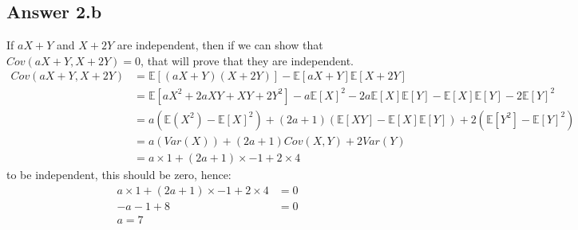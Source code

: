 \documentclass[a4paper]{article}
\begin{document}
\subsection{Answer 2.b}
If $aX+ Y $ and $X+2 Y$ are independent, then if we can show that $Cov\left( aX+Y, X+2Y \right) = 0$, that will prove that they are independent.
\begin{equation*}
	\begin{split}
		Cov\left( aX+Y, X+2Y \right) &= \mathbb{E}\left[ \left( aX+Y \right) \left( X+2Y \right)  \right] - \mathbb{E}\left[ aX+Y \right] \mathbb{E}\left[ X+2Y \right]\\
		&= \mathbb{E}\left[ aX^2 + 2aXY + XY + 2Y^2 \right] - a\mathbb{E}\left[ X \right] ^2 - 2a\mathbb{E}\left[ X \right] \mathbb{E}\left[ Y \right] - \mathbb{E}\left[ X \right] \mathbb{E}\left[ Y \right] - 2\mathbb{E}\left[ Y \right] ^2\\
		&= a\left( \mathbb{E}\left( X^2 \right) - \mathbb{E}\left[ X \right] ^2 \right)
	+ (2a+1)\left( \mathbb{E}\left[ XY \right] - \mathbb{E}\left[ X \right] \mathbb{E}\left[ Y \right]  \right) + 2\left( \mathbb{E}\left[ Y^2 \right] - \mathbb{E}\left[ Y \right] ^2 \right) \\
	&= a\left( Var\left( X \right)  \right) + \left( 2a+1 \right) Cov\left( X,Y \right) + 2Var\left( Y \right)\\
	&= a\times 1 + \left( 2a+1 \right) \times -1 + 2\times 4
	\end{split}
\end{equation*}
to be independent, this should be zero, hence:
\begin{equation*}
	\begin{split}
		 a\times 1 + \left( 2a+1 \right) \times -1 + 2\times 4 &=  0\\
		 -a -1 + 8 &= 0\\
		 a = 7
	\end{split}
\end{equation*}
\end{document}

